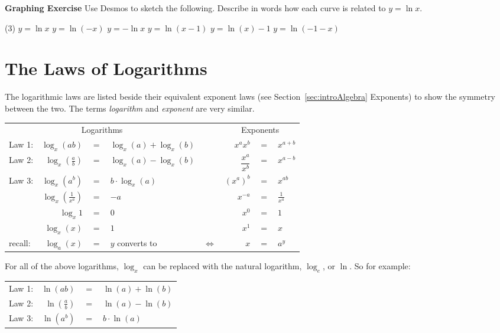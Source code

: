 \textbf{Graphing Exercise}
Use Desmos to sketch the following. Describe in words how each curve is related to $y =\ln  x$. 

\begin{tasks}(3)
	\task $y =\ln  x$ 
\task  $y =\ln  ( -x)$ 
\task  $y = -\ln  x$ 
	\task  $y =\ln  (x -1)$ 
	\task  $y =\ln  (x) -1$ 
	\task $y =\ln  ( -1 -x)$ \end{tasks}


\section{The Laws of Logarithms}

The logarithmic laws are listed beside their equivalent exponent laws (see Section~\ref{sec:introAlgebra} Exponents) to show the symmetry between the two. The terms \textit{logarithm} and \textit{exponent} are very similar.
\begin{tcolorbox}
\begin{center}
\renewcommand{\arraystretch}{1.2}
\begin{tabular}{lrclcrcl}
	\multicolumn{4}{c}{Logarithms}& &\multicolumn{3}{c}{Exponents}\\
	\cmidrule{1-4}\cmidrule{6-8}
	Law 1: &$ \log_x(ab) $&$=$&$ \log_x(a)+\log_x(b)  $&\hspace{1cm} &$x^a x^b$&$=$&$x^{a+b} $\\
	Law 2: &$ \log_x\left(\frac{a}{b}\right) $&$=$&$  \log_x(a)-\log_x(b) $& &$\dfrac{x^a}{x^b}$&$=$&$x^{a-b}  $\\
	Law 3: &$ \log_x(a^b) $&$=$&$ b\cdot\log_x(a)   $& &$(x^a)^b $&$=$&$x^{ab} $\\
	\cmidrule{1-4}\cmidrule{6-8}
	&$  \log_{x}\left(\frac{1}{x^a}\right) $&$=$&$-a   $& &$x^{-a} $&$=$&$\frac{1}{x^a} $\\
	&$ \log_{x}1  $&$=$&$ 0  $& &$x^0 $&$=$&$1 $\\
	&$ \log_x(x) $&$=$&$  1 $& &$x^1 $&$=$&$x $\\
	\bottomrule
	recall:&$ \log_a(x) $&$=$&$y$\hspace{0.5cm} converts to& $\Leftrightarrow$ &$x $&$=$&$a^y $\\
	\bottomrule
\end{tabular}
\end{center}
For all of the above logarithms, $\log_x$ can be replaced with the natural logarithm, $\log_e$,  or $\ln$. So for example:
\begin{center}
	\renewcommand{\arraystretch}{1.2}
	\begin{tabular}{lrcl}
		Law 1: &$ \ln(ab) $&$=$&$ \ln(a)+\ln(b)  $\\
		Law 2: &$ \ln\left(\frac{a}{b}\right) $&$=$&$  \ln(a)-\ln(b) $\\
		Law 3: &$ \ln(a^b) $&$=$&$ b\cdot\ln(a)$ \\
	\end{tabular}
\end{center}
\end{tcolorbox}
